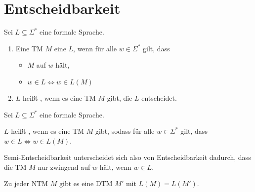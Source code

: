 \section{Entscheidbarkeit}

\begin{definition}[Entscheidbarkeit]
	Sei $L \subseteq \Sigma^*$ eine formale Sprache.
	\begin{enumerate}
		\item
			Eine TM $M$  eine $L$, wenn für alle 
			$w \in \Sigma^*$ gilt, dass
			\begin{itemize}
				\item
					$M$ auf $w$ hält,
				\item
					$w \in L \Longleftrightarrow w \in L(M)$
			\end{itemize}
		\item
			$L$ heißt
			, wenn es eine TM $M$ gibt, die $L$ 
			entscheidet.
	\end{enumerate}
\end{definition}

\begin{definition}
	Sei $L \subseteq \Sigma^*$ eine formale Sprache.

	$L$ heißt , wenn es eine TM $M$ gibt, sodass für
	alle $w \in \Sigma^*$ gilt, dass $w \in L \Longleftrightarrow w \in
	L(M)$.
\end{definition}

\begin{remark}
	Semi-Entscheidbarkeit unterscheidet sich also von Entscheidbarkeit
	dadurch, dass die TM $M$ nur zwingend auf $w$ hält, wenn $w \in L$.
\end{remark}

\begin{theorem}
	Zu jeder NTM $M$ gibt es eine DTM $M'$ mit $L(M) = L(M')$.
\end{theorem}

